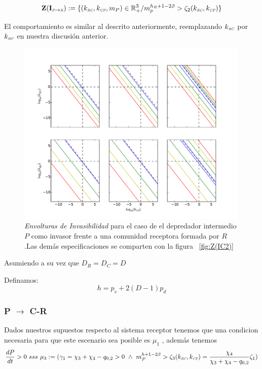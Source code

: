 \begin{equation}
\mathbf{Z(I_{\textit{\tiny P} \to \textit{\tiny R}})} := \{ (k_{\textit{\tiny RC}},k_{\textit{\tiny CP}},m_P) \in \mathbb{R}^3_+ / m_p^{h_R + 1 - 2\beta} > \zeta_2(k_{\textit{\tiny RC}},k_{\textit{\tiny CP}}) \}
\end{equation}

El comportamiento es similar al descrito anteriormente, reemplazando $k_{\textit{\tiny RC}}$ por $k_{\textit{\tiny RP}}$ en nuestra discusi\'on anterior.


\begin{figure}
  \centering
  \includegraphics[width = 0.99\textwidth]{./Plots/Z(IC3)AcGrGr.pdf}
  \caption[Env $Z(IC2)$]{\emph{Envolturas de Invasibilidad} para el caso de el depredador intermedio $P$ como invasor frente a una comunidad receptora formada por $R$.Las dem\'as especificaciones se comparten con la figura ~\ref{fig:Z(IC2)}}
  \label{fig:Z(IC3)}
\end{figure}


Asumiendo a su vez que $D_R = D_C = D$

Definamos:
\begin{equation}
  h = p_v + 2(D-1)p_d
\end{equation}

\subsubsection{P $\to$ C-R}
Dados nuestros supuestos respecto al sistema receptor tenemos que una condicion necesaria para que este escenario sea posible es $\mu_1$ , adem\'as tenemos
\begin{equation}
  \frac{dP}{dt}  >0 \ sss \  \mu_3 := (\gamma_1 = \chi_3 + \chi_4 - q_{0,2} >0 \ \land \ m_P^{h + 1 - 2\beta} > \zeta_3(k_{\textit{\tiny RC}},k_{\textit{\tiny CP}}) = \frac{\chi_4}{\chi_3 + \chi_4 - q_{0,2}}\zeta_1)
\end{equation}

